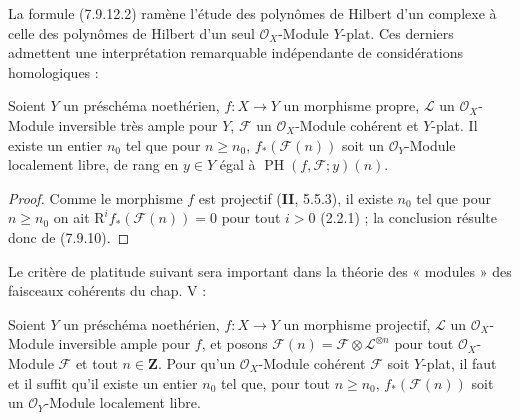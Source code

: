 La formule (7.9.12.2) ramène l'étude des polynômes de Hilbert d'un complexe à
celle des polynômes de Hilbert d'un seul $\mathscr O_X$-Module $Y$-plat. Ces
derniers admettent une interprétation remarquable indépendante de considérations
homologiques :

\begin{corollary}[7.9.13]
\label{III.7.9.13.fr}
Soient $Y$ un préschéma noethérien, $f:X\to Y$ un morphisme propre,
$\mathscr L$ un $\mathscr O_X$-Module inversible très ample pour $Y$,
$\mathscr F$ un $\mathscr O_X$-Module cohérent et $Y$-plat. Il existe un entier
$n_0$ tel que pour $n\geq n_0$, $f_*(\mathscr F(n))$ soit un
$\mathscr O_Y$-Module localement libre, de rang en $y\in Y$ égal à
$\operatorname{PH}(f,\mathscr F;y)(n)$.
\end{corollary}

\begin{proof}
Comme le morphisme $f$ est projectif (\textbf{II}, 5.5.3), il existe $n_0$ tel que pour
$n\geq n_0$
on ait $\mathrm R^if_*(\mathscr F(n))=0$ pour tout $i>0$ (2.2.1) ; la conclusion
résulte donc de (7.9.10).
\end{proof}

Le critère de platitude suivant sera important dans la théorie des « modules »
des faisceaux cohérents du chap. V :

\begin{proposition}[7.9.14]
\label{III.7.9.14.fr}
Soient $Y$ un préschéma noethérien, $f:X\to Y$ un morphisme projectif,
$\mathscr L$ un $\mathscr O_X$-Module inversible ample pour $f$, et posons
$\mathscr F(n)=\mathscr F\otimes\mathscr L^{\otimes n}$ pour tout
$\mathscr O_X$-Module $\mathscr F$ et tout $n\in\mathbf Z$. Pour qu'un
$\mathscr O_X$-Module cohérent $\mathscr F$ soit $Y$-plat, il faut et il suffit
qu'il existe un entier $n_0$ tel que, pour tout $n\geq n_0$,
$f_*(\mathscr F(n))$ soit un $\mathscr O_Y$-Module localement libre.
\end{proposition}

